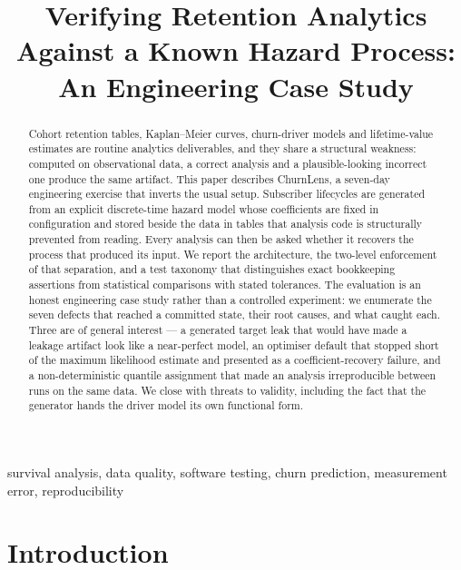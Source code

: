 \documentclass[conference]{IEEEtran}
\begin{document}
\title{Verifying Retention Analytics Against a Known Hazard Process:\\
An Engineering Case Study}

\author{
}

\maketitle

\begin{abstract}
Cohort retention tables, Kaplan--Meier curves, churn-driver models and
lifetime-value estimates are routine analytics deliverables, and they share a
structural weakness: computed on observational data, a correct analysis and a
plausible-looking incorrect one produce the same artifact. This paper describes
ChurnLens, a seven-day engineering exercise that inverts the usual setup.
Subscriber lifecycles are generated from an explicit discrete-time hazard model
whose coefficients are fixed in configuration and stored beside the data in
tables that analysis code is structurally prevented from reading. Every
analysis can then be asked whether it recovers the process that produced its
input. We report the architecture, the two-level enforcement of that
separation, and a test taxonomy that distinguishes exact bookkeeping assertions
from statistical comparisons with stated tolerances. The evaluation is an
honest engineering case study rather than a controlled experiment: we enumerate
the seven defects that reached a committed state, their root causes, and what
caught each. Three are of general interest --- a generated target leak that
would have made a leakage artifact look like a near-perfect model, an optimiser
default that stopped short of the maximum likelihood estimate and presented as
a coefficient-recovery failure, and a non-deterministic quantile assignment
that made an analysis irreproducible between runs on the same data. We close
with threats to validity, including the fact that the generator hands the
driver model its own functional form.
\end{abstract}

\begin{IEEEkeywords}
survival analysis, data quality, software testing, churn prediction, measurement
error, reproducibility
\end{IEEEkeywords}

\section{Introduction}
\end{document}
